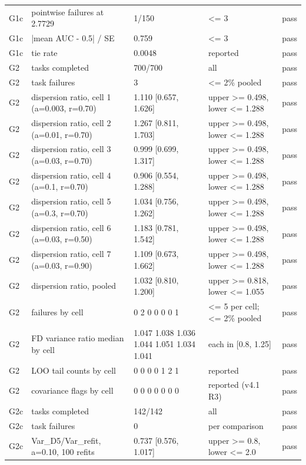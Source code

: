 \begin{tabular}{lllll}
G1c & pointwise failures at 2.7729 & 1/150 & \textless{}= 3 & pass \\
G1c & |mean AUC - 0.5| / SE & 0.759 & \textless{}= 3 & pass \\
G1c & tie rate & 0.0048 & reported & pass \\
G2 & tasks completed & 700/700 & all & pass \\
G2 & task failures & 3 & \textless{}= 2\% pooled & pass \\
G2 & dispersion ratio, cell 1 (a=0.003, r=0.70) & 1.110 [0.657, 1.626] & upper \textgreater{}= 0.498, lower \textless{}= 1.288 & pass \\
G2 & dispersion ratio, cell 2 (a=0.01, r=0.70) & 1.267 [0.811, 1.703] & upper \textgreater{}= 0.498, lower \textless{}= 1.288 & pass \\
G2 & dispersion ratio, cell 3 (a=0.03, r=0.70) & 0.999 [0.699, 1.317] & upper \textgreater{}= 0.498, lower \textless{}= 1.288 & pass \\
G2 & dispersion ratio, cell 4 (a=0.1, r=0.70) & 0.906 [0.554, 1.288] & upper \textgreater{}= 0.498, lower \textless{}= 1.288 & pass \\
G2 & dispersion ratio, cell 5 (a=0.3, r=0.70) & 1.034 [0.756, 1.262] & upper \textgreater{}= 0.498, lower \textless{}= 1.288 & pass \\
G2 & dispersion ratio, cell 6 (a=0.03, r=0.50) & 1.183 [0.781, 1.542] & upper \textgreater{}= 0.498, lower \textless{}= 1.288 & pass \\
G2 & dispersion ratio, cell 7 (a=0.03, r=0.90) & 1.109 [0.673, 1.662] & upper \textgreater{}= 0.498, lower \textless{}= 1.288 & pass \\
G2 & dispersion ratio, pooled & 1.032 [0.810, 1.200] & upper \textgreater{}= 0.818, lower \textless{}= 1.055 & pass \\
G2 & failures by cell & 0 2 0 0 0 0 1 & \textless{}= 5 per cell; \textless{}= 2\% pooled & pass \\
G2 & FD variance ratio median by cell & 1.047 1.038 1.036 1.044 1.051 1.034 1.041 & each in [0.8, 1.25] & pass \\
G2 & LOO tail counts by cell & 0 0 0 0 1 2 1 & reported & pass \\
G2 & covariance flags by cell & 0 0 0 0 0 0 0 & reported (v4.1 R3) & pass \\
G2c & tasks completed & 142/142 & all & pass \\
G2c & task failures & 0 & per comparison & pass \\
G2c & Var\_D5/Var\_refit, a=0.10, 100 refits & 0.737 [0.576, 1.017] & upper \textgreater{}= 0.8, lower \textless{}= 2.0 & pass \\

\end{tabular}
